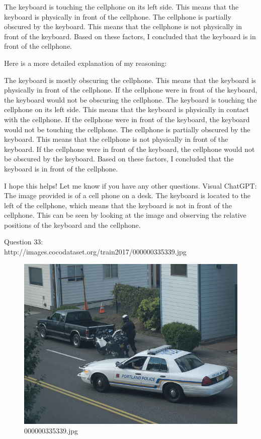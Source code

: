 \begin{enumerate}
        The keyboard is touching the cellphone on its left side. This means that the keyboard is physically in front of the cellphone.
        The cellphone is partially obscured by the keyboard. This means that the cellphone is not physically in front of the keyboard.
        Based on these factors, I concluded that the keyboard is in front of the cellphone.
        
        Here is a more detailed explanation of my reasoning:
        
        The keyboard is mostly obscuring the cellphone. This means that the keyboard is physically in front of the cellphone. If the cellphone were in front of the keyboard, the keyboard would not be obscuring the cellphone.
        The keyboard is touching the cellphone on its left side. This means that the keyboard is physically in contact with the cellphone. If the cellphone were in front of the keyboard, the keyboard would not be touching the cellphone.
        The cellphone is partially obscured by the keyboard. This means that the cellphone is not physically in front of the keyboard. If the cellphone were in front of the keyboard, the cellphone would not be obscured by the keyboard.
        Based on these factors, I concluded that the keyboard is in front of the cellphone.
        
        I hope this helps! Let me know if you have any other questions.
        \subitem Visual ChatGPT: The image provided is of a cell phone on a desk. The keyboard is located to the left of the cellphone, which means that the keyboard is not in front of the cellphone. This can be seen by looking at the image and observing the relative positions of the keyboard and the cellphone.
    \end{enumerate}
Question 33:\\http://images.cocodataset.org/train2017/000000335339.jpg
    \begin{figure}[h]
        \centering
        \includegraphics[width=0.8\linewidth]{../image set/easy/000000335339.jpg}
        \caption{000000335339.jpg}
    \end{figure} 
